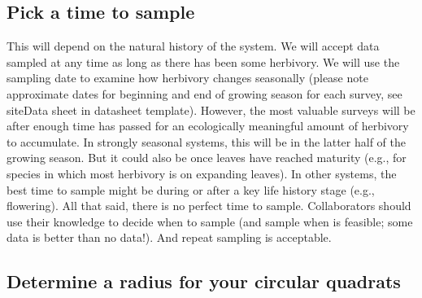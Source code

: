 \documentclass[
  letterpaper,
  oneside,
  open=any]{scrbook}
\begin{document}
\subsection{Pick a time to sample}\label{pick-a-time-to-sample}

This will depend on the natural history of the system. We will accept
data sampled at any time as long as there has been some herbivory. We
will use the sampling date to examine how herbivory changes seasonally
(please note approximate dates for beginning and end of growing season
for each survey, see siteData sheet in datasheet template). However, the
most valuable surveys will be after enough time has passed for an
ecologically meaningful amount of herbivory to accumulate. In strongly
seasonal systems, this will be in the latter half of the growing season.
But it could also be once leaves have reached maturity (e.g., for
species in which most herbivory is on expanding leaves). In other
systems, the best time to sample might be during or after a key life
history stage (e.g., flowering). All that said, there is no perfect time
to sample. Collaborators should use their knowledge to decide when to
sample (and sample when is feasible; some data is better than no data!).
And repeat sampling is acceptable.

\subsection{Determine a radius for your circular
quadrats}\label{determine-a-radius-for-your-circular-quadrats}
\end{document}
